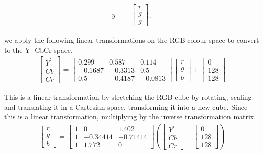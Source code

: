 \documentclass{article}
\begin{document}
		\begin{align}
			y &= \begin{bmatrix}
			r \\
			g \\
			g
			\end{bmatrix},
		\end{align}
	
	we apply the following linear transformations on the RGB colour space to convert to the $\textrm{Y}^\prime$ CbCr space.\\
	
	\begin{align}
		\begin{bmatrix}
			Y^\prime \\
			Cb \\
			Cr
			\end{bmatrix}
			= 	
		\begin{bmatrix}
			0.299 & 0.587 & 0.114\\
			-0.1687 & -0.3313 & 0.5\\
			0.5 & -0.4187 & -0.0813
		\end{bmatrix}
		\begin{bmatrix}
		r \\
		g \\
		b
		\end{bmatrix}
		+
		\begin{bmatrix}
		0 \\
		128 \\
		128
		\end{bmatrix}
	\end{align}
	
	This is a linear transformation by stretching the RGB cube by rotating, scaling and translating it in a Cartesian space, transforming it into a new cube. Since this is a linear transformation, multiplying by the inverse transformation matrix.\\
	
	\begin{align}
		\begin{bmatrix}
			r \\
			g \\
			b
		\end{bmatrix}
		= 	
		\begin{bmatrix}
			1 & 0 & 1.402\\
			1 & -0.34414 & -0.71414\\
			1 & 1.772 & 0
		\end{bmatrix}
		\left(
			\begin{bmatrix}
				Y^\prime \\
				Cb \\
				Cr
			\end{bmatrix}
			-
			\begin{bmatrix}
				0 \\
				128 \\
				128
			\end{bmatrix}
		\right)
	\end{align} 
	
\end{document}
